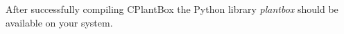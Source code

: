 % 
After successfully compiling CPlantBox the Python library \emph{plantbox} should be available on your system. 
